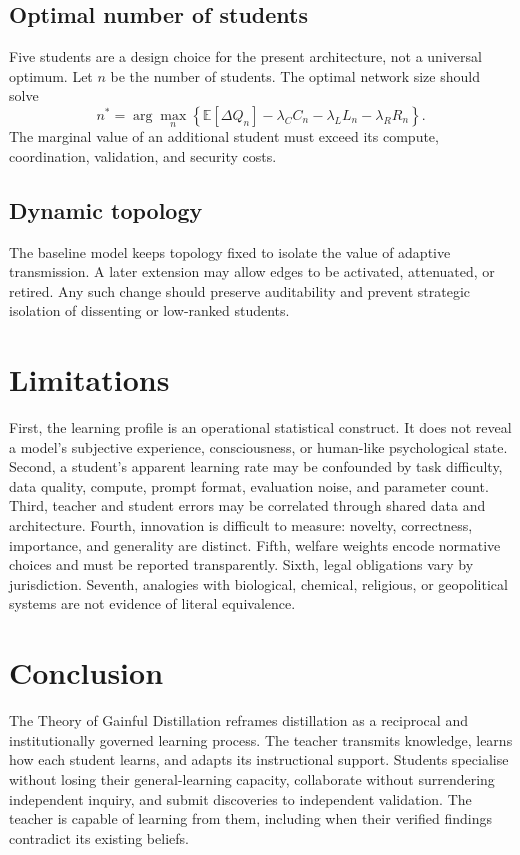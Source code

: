 \documentclass[11pt,a4paper]{article}
\begin{document}
\subsection{Optimal number of students}

Five students are a design choice for the present architecture, not a universal optimum. Let \(n\) be the number of students. The optimal network size should solve
\begin{equation}
n^*
=
\arg\max_n
\left\{
\mathbb E[\Delta Q_n]
-\lambda_C C_n
-\lambda_L L_n
-\lambda_R R_n
\right\}.
\end{equation}
The marginal value of an additional student must exceed its compute, coordination, validation, and security costs.

\subsection{Dynamic topology}

The baseline model keeps topology fixed to isolate the value of adaptive transmission. A later extension may allow edges to be activated, attenuated, or retired. Any such change should preserve auditability and prevent strategic isolation of dissenting or low-ranked students.

\section{Limitations}

First, the learning profile is an operational statistical construct. It does not reveal a model's subjective experience, consciousness, or human-like psychological state. Second, a student's apparent learning rate may be confounded by task difficulty, data quality, compute, prompt format, evaluation noise, and parameter count. Third, teacher and student errors may be correlated through shared data and architecture. Fourth, innovation is difficult to measure: novelty, correctness, importance, and generality are distinct. Fifth, welfare weights encode normative choices and must be reported transparently. Sixth, legal obligations vary by jurisdiction. Seventh, analogies with biological, chemical, religious, or geopolitical systems are not evidence of literal equivalence.

\section{Conclusion}

The Theory of Gainful Distillation reframes distillation as a reciprocal and institutionally governed learning process. The teacher transmits knowledge, learns how each student learns, and adapts its instructional support. Students specialise without losing their general-learning capacity, collaborate without surrendering independent inquiry, and submit discoveries to independent validation. The teacher is capable of learning from them, including when their verified findings contradict its existing beliefs.
\end{document}
